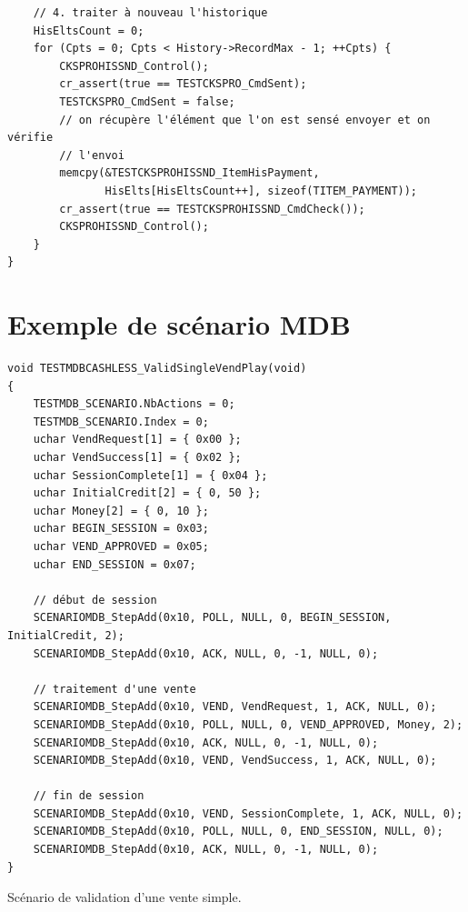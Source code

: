 \documentclass[a4paper]{article}
\begin{document}
\begin{verbatim}
    // 4. traiter à nouveau l'historique
    HisEltsCount = 0;
    for (Cpts = 0; Cpts < History->RecordMax - 1; ++Cpts) {
        CKSPROHISSND_Control();
        cr_assert(true == TESTCKSPRO_CmdSent);
        TESTCKSPRO_CmdSent = false;
        // on récupère l'élément que l'on est sensé envoyer et on vérifie
        // l'envoi
        memcpy(&TESTCKSPROHISSND_ItemHisPayment,
               HisElts[HisEltsCount++], sizeof(TITEM_PAYMENT));
        cr_assert(true == TESTCKSPROHISSND_CmdCheck());
        CKSPROHISSND_Control();
    }
}
\end{verbatim}
\label{testsaveckwash}
\clearpage{}
\section{Exemple de scénario MDB}\label{appendix:exscenariomdb}

\begin{listing}[ht!]
\begin{verbatim}
void TESTMDBCASHLESS_ValidSingleVendPlay(void)
{
    TESTMDB_SCENARIO.NbActions = 0;
    TESTMDB_SCENARIO.Index = 0;
    uchar VendRequest[1] = { 0x00 };
    uchar VendSuccess[1] = { 0x02 };
    uchar SessionComplete[1] = { 0x04 };
    uchar InitialCredit[2] = { 0, 50 };
    uchar Money[2] = { 0, 10 };
    uchar BEGIN_SESSION = 0x03;
    uchar VEND_APPROVED = 0x05;
    uchar END_SESSION = 0x07;

    // début de session
    SCENARIOMDB_StepAdd(0x10, POLL, NULL, 0, BEGIN_SESSION, InitialCredit, 2);
    SCENARIOMDB_StepAdd(0x10, ACK, NULL, 0, -1, NULL, 0);

    // traitement d'une vente
    SCENARIOMDB_StepAdd(0x10, VEND, VendRequest, 1, ACK, NULL, 0);
    SCENARIOMDB_StepAdd(0x10, POLL, NULL, 0, VEND_APPROVED, Money, 2);
    SCENARIOMDB_StepAdd(0x10, ACK, NULL, 0, -1, NULL, 0);
    SCENARIOMDB_StepAdd(0x10, VEND, VendSuccess, 1, ACK, NULL, 0);

    // fin de session
    SCENARIOMDB_StepAdd(0x10, VEND, SessionComplete, 1, ACK, NULL, 0);
    SCENARIOMDB_StepAdd(0x10, POLL, NULL, 0, END_SESSION, NULL, 0);
    SCENARIOMDB_StepAdd(0x10, ACK, NULL, 0, -1, NULL, 0);
}
\end{verbatim}
\caption{Scénario de validation d'une vente simple.}
\label{check-example}
\end{listing}
\end{document}
